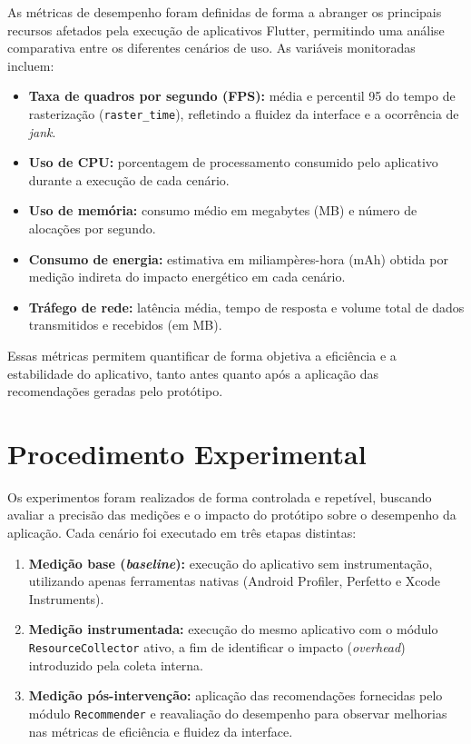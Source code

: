 \documentclass[12pt,a4paper,oneside]{abntex2}
\begin{document}
As métricas de desempenho foram definidas de forma a abranger os principais recursos afetados pela execução de aplicativos Flutter, permitindo uma análise comparativa entre os diferentes cenários de uso. As variáveis monitoradas incluem:

\begin{itemize}
  \item \textbf{Taxa de quadros por segundo (FPS):} média e percentil 95 do tempo de rasterização (\texttt{raster\_time}), refletindo a fluidez da interface e a ocorrência de \textit{jank}.
  \item \textbf{Uso de CPU:} porcentagem de processamento consumido pelo aplicativo durante a execução de cada cenário.
  \item \textbf{Uso de memória:} consumo médio em megabytes (MB) e número de alocações por segundo.
  \item \textbf{Consumo de energia:} estimativa em miliampères-hora (mAh) obtida por medição indireta do impacto energético em cada cenário.
  \item \textbf{Tráfego de rede:} latência média, tempo de resposta e volume total de dados transmitidos e recebidos (em MB).
\end{itemize}

Essas métricas permitem quantificar de forma objetiva a eficiência e a estabilidade do aplicativo, tanto antes quanto após a aplicação das recomendações geradas pelo protótipo.

\section{Procedimento Experimental}

Os experimentos foram realizados de forma controlada e repetível, buscando avaliar a precisão das medições e o impacto do protótipo sobre o desempenho da aplicação.  
Cada cenário foi executado em três etapas distintas:

\begin{enumerate}
  \item \textbf{Medição base (\textit{baseline}):} execução do aplicativo sem instrumentação, utilizando apenas ferramentas nativas (Android Profiler, Perfetto e Xcode Instruments).
  \item \textbf{Medição instrumentada:} execução do mesmo aplicativo com o módulo \texttt{ResourceCollector} ativo, a fim de identificar o impacto (\textit{overhead}) introduzido pela coleta interna.
  \item \textbf{Medição pós-intervenção:} aplicação das recomendações fornecidas pelo módulo \texttt{Recommender} e reavaliação do desempenho para observar melhorias nas métricas de eficiência e fluidez da interface.
\end{enumerate}
\end{document}
